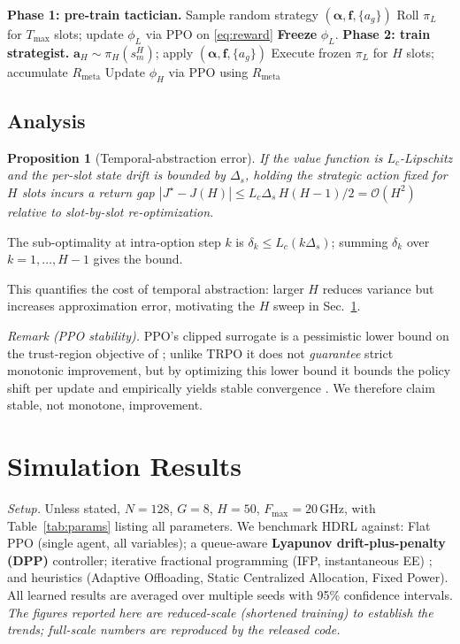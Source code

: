 \documentclass[conference]{IEEEtran}
\newtheorem{proposition}{Proposition}
\newcommand{\ba}{\boldsymbol{\alpha}}
\begin{document}
\begin{algorithm}[t]
\caption{Two-phase HDRL training}
\label{alg:hdrl}
\begin{algorithmic}[1]
\STATE \textbf{Phase 1: pre-train tactician.}
\STATE Sample random strategy $(\ba,\mathbf{f},\{a_g\})$
\STATE Roll $\pi_L$ for $T_{\max}$ slots; update $\phi_L$ via PPO on \eqref{eq:reward}
\ENDFOR
\STATE \textbf{Freeze} $\phi_L$.
\STATE \textbf{Phase 2: train strategist.}
\STATE $\mathbf{a}_H\sim\pi_H(s_m^H)$; apply $(\ba,\mathbf{f},\{a_g\})$
\STATE Execute frozen $\pi_L$ for $H$ slots; accumulate $R_{\mathrm{meta}}$
\STATE Update $\phi_H$ via PPO using $R_{\mathrm{meta}}$
\ENDFOR
\ENDFOR
\end{algorithmic}
\end{algorithm}

\subsection{Analysis}
\begin{proposition}[Temporal-abstraction error]\label{prop:H}
If the value function is $L_c$-Lipschitz and the per-slot state drift is bounded by
$\Delta_s$, holding the strategic action fixed for $H$ slots incurs a return gap
$|J^\star-J(H)|\le L_c\Delta_s\,H(H{-}1)/2=\mathcal{O}(H^2)$ relative to
slot-by-slot re-optimization.
\end{proposition}
\begin{IEEEproof}[Sketch]
The sub-optimality at intra-option step $k$ is $\delta_k\le L_c(k\Delta_s)$; summing
$\delta_k$ over $k=1,\dots,H{-}1$ gives the bound.
\end{IEEEproof}
This quantifies the cost of temporal abstraction: larger $H$ reduces variance but
increases approximation error, motivating the $H$ sweep in Sec.~\ref{sec:results}.

\emph{Remark (PPO stability).} PPO's clipped surrogate is a pessimistic lower bound
on the trust-region objective of \cite{schulman2015trust}; unlike TRPO it does not
\emph{guarantee} strict monotonic improvement, but by optimizing this lower bound it
bounds the policy shift per update and empirically yields stable convergence
\cite{schulman2017proximal}. We therefore claim stable, not monotone, improvement.

\section{Simulation Results}\label{sec:results}
\emph{Setup.} Unless stated, $N=128$, $G=8$, $H=50$, $F_{\max}=20$\,GHz, with
Table~\ref{tab:params} listing all parameters. We benchmark HDRL against: Flat PPO
(single agent, all variables); a queue-aware \textbf{Lyapunov drift-plus-penalty
(DPP)} controller; iterative fractional programming (IFP, instantaneous EE)
\cite{shen2018fractional}; and heuristics (Adaptive Offloading, Static Centralized
Allocation, Fixed Power). All learned results are averaged over multiple seeds with
95\% confidence intervals. \emph{The figures reported here are reduced-scale
(shortened training) to establish the trends; full-scale numbers are reproduced by
the released code.}
\end{document}
